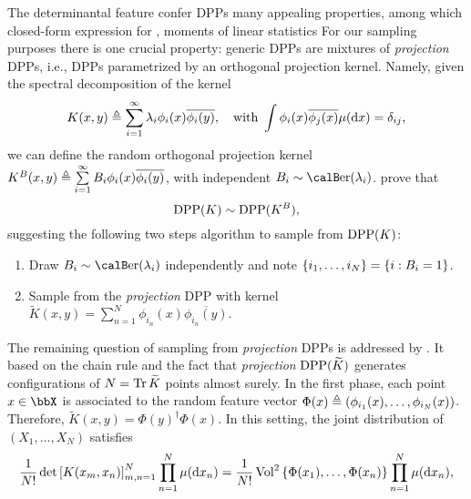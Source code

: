 \documentclass[twoside,11pt]{article}
\begin{document}
      The determinantal feature confer DPPs many appealing properties, among which closed-form expression for , moments of linear statistics \etc
      For our sampling purposes there is one crucial property: generic DPPs are mixtures of \textit{projection} DPPs, i.e., DPPs parametrized by an orthogonal projection kernel.
      Namely, given the spectral decomposition of the kernel
      \begin{equation}
      \label{eq:eigdec_kernel}
        K(x,y)\triangleq\sum\limits_{i=1}^{\infty} \lambda_i \phi_i(x) \overline{\phi_i(y)},
        \quad \text{with }
        \int \phi_i(x) \overline{\phi_j(x)} \mu(\mathop{}\!\mathrm{d} x) = \delta_{ij},
      \end{equation}
			\noindent
      we can define the random orthogonal projection kernel
      $
        K^B(x,y)
          \triangleq \sum\limits_{i=1}^{\infty} B_i \phi_i(x) \overline{\phi_i(y)}
      $, with independent $B_i\sim\Ber(\lambda_i)$.
      \citet[Theorem 7]{HKPV06} prove that
      \begin{equation}
        \operatorname{DPP}(K) \sim \operatorname{DPP}(K^B),
      \end{equation}
      suggesting the following two steps algorithm to sample from $\operatorname{DPP}(K)$:
      \begin{enumerate}
        \item Draw $B_i\sim\Ber(\lambda_i)$ independently and note $\left\{ i_1,\dots,i_{N} \right\} = \left\{ i:B_i=1 \right\}$.
        \item Sample from the \textit{projection} DPP with kernel $\tilde{K}(x,y) = \sum_{n=1}^{N}\phi_{i_n}(x) \overline{\phi_{i_n}(y)}$.
      \end{enumerate}
			\noindent
      The remaining question of sampling from \textit{projection} DPPs is addressed by \citet[Algorithm 18]{HKPV06}.
      It based on the chain rule and the fact that \textit{projection} $\operatorname{DPP}(\widetilde{K})$ generates configurations of $N=\operatorname{Tr} \widetilde{K}$ points almost surely.
      In the first phase, each point $x\in \bbX$ is associated to the random feature vector $\Phi(x) \triangleq \left( \phi_{i_1}(x),\dots,\phi_{i_N}(x) \right)$. Therefore, $\tilde{K}(x,y) = \Phi(y)^{\dagger} \Phi(x)$.
      In this setting, the joint distribution of $(X_1,\dots,X_N)$ satisfies
      \begin{equation}
      \label{eq:joint_distribution}
        \frac{1}{N!} \det \left[ K(x_m,x_n) \right]_{m,n=1}^N \prod_{n=1}^N\mu(\mathop{}\!\mathrm{d} x_n)
          = \frac{1}{N!} \operatorname{Vol}^2\left\{ \Phi(x_1),\dots,\Phi(x_n) \right\} \prod_{n=1}^N\mu(\mathop{}\!\mathrm{d} x_n),
      \end{equation}
\end{document}
